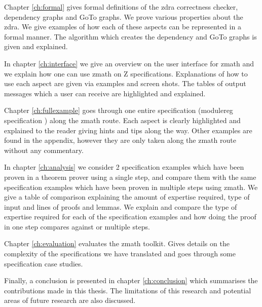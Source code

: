 Chapter \ref{ch:formal} gives formal definitions of the \gls{zdra} correctness checker, dependency graphs and GoTo graphs. We prove various properties about the \gls{zdra}. We give examples of how each of these aspects can be represented in a formal manner. The algorithm which creates the dependency and GoTo graphs is given and explained.

In chapter \ref{ch:interface} we give an overview on the user interface for \gls{zmath} and we explain how one can use \gls{zmath} on Z specifications. Explanations of how to use each aspect are given via examples and screen shots. The tables of output messages which a user can receive are highlighted and explained.

Chapter \ref{ch:fullexample} goes through one entire specification (modulereg specification \cite{essenceofz}) along the \gls{zmath} route. Each aspect is clearly highlighted and explained to the reader giving hints and tips along the way. Other examples are found in the appendix, however they are only taken along the \gls{zmath} route without any commentary.

In chapter \ref{ch:analysis} we consider 2 specification examples which have been proven in a theorem prover using a single step, and compare them with the same specification examples which have been proven in multiple steps using \gls{zmath}. We give a table of comparison explaining the amount of expertise required, type of input and lines of proofs and lemmas. We explain and compare the type of expertise required for each of the specification examples and how doing the proof in one step compares against or multiple steps.

Chapter \ref{ch:evaluation} evaluates the \gls{zmath} toolkit. Gives details on the complexity of the specifications we have translated and goes through some specification case studies.

Finally, a conclusion is presented in chapter \ref{ch:conclusion} which summarises the contributions made in this thesis. The limitations of this research and potential areas of future research are also discussed.
